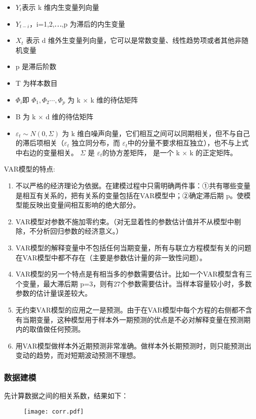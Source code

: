 \documentclass[a4paper,AutoFakeBold,AutoFakeSlant]{ctexart}
\begin{document}
\begin{itemize}
  \item $Y_t$表示 k 维内生变量列向量
  \item $Y_{t-i}$​，i=1,2,⋯,p 为滞后的内生变量
  \item $X_t​$ 表示 d 维外生变量列向量，它可以是常数变量、线性趋势项或者其他非随机变量
  \item p 是滞后阶数
  \item T 为样本数目
  \item $\Phi_i$即 $\Phi _1,\Phi _2\cdots ,\Phi _p$ 为  k $\times$ k  维的待估矩阵
  \item B 为 k $\times$ d 维的待估矩阵
  \item $\varepsilon_t​ \sim N(0,\Sigma)$ 为 k 维白噪声向量，它们相互之间可以同期相关，但不与自己的滞后项相关（$\varepsilon _t$ 独立同分布，而 $\varepsilon _t$ ​ 中的分量不要求相互独立），也不与上式中右边的变量相关。 $\Sigma$  是 $\varepsilon _t$ ​ 的协方差矩阵， 是一个  k $\times$ k  的正定矩阵。
\end{itemize}

VAR模型的特点:
\begin{enumerate}
  \item 不以严格的经济理论为依据。在建模过程中只需明确两件事：①共有哪些变量是相互有关系的，把有关系的变量包括在VAR模型中；②确定滞后期 p。使模型能反映出变量间相互影响的绝大部分。
  \item VAR模型对参数不施加零约束。（对无显着性的参数估计值并不从模型中剔除，不分析回归参数的经济意义。）
  \item VAR模型的解释变量中不包括任何当期变量，所有与联立方程模型有关的问题在VAR模型中都不存在（主要是参数估计量的非一致性问题）。
  \item VAR模型的另一个特点是有相当多的参数需要估计。比如一个VAR模型含有三个变量，最大滞后期 p=3，则有27个参数需要估计。当样本容量较小时，多数参数的估计量误差较大。
  \item 无约束VAR模型的应用之一是预测。由于在VAR模型中每个方程的右侧都不含有当期变量，这种模型用于样本外一期预测的优点是不必对解释变量在预测期内的取值做任何预测。
  \item 用VAR模型做样本外近期预测非常准确。做样本外长期预测时，则只能预测出变动的趋势，而对短期波动预测不理想。
\end{enumerate}

\subsubsection{数据建模}
先计算数据之间的相关系数，结果如下：
\begin{figure}[htbp]
  \centering
  \texttt{[image: corr.pdf]}
  \label{f9}
\end{figure}
\end{document}
